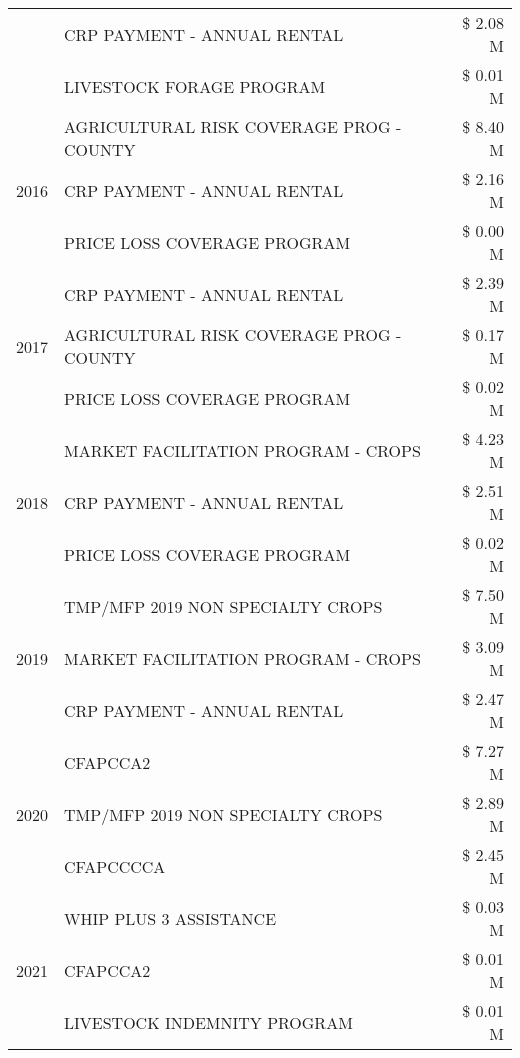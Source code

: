 \begin{tabular}{llr}
 & CRP PAYMENT - ANNUAL RENTAL & \$ 2.08 M \\
 & LIVESTOCK FORAGE PROGRAM & \$ 0.01 M \\
\cline{1-3}
\multirow[t]{3}{*}{2016} & AGRICULTURAL RISK COVERAGE PROG - COUNTY & \$ 8.40 M \\
 & CRP PAYMENT - ANNUAL RENTAL & \$ 2.16 M \\
 & PRICE LOSS COVERAGE PROGRAM & \$ 0.00 M \\
\cline{1-3}
\multirow[t]{3}{*}{2017} & CRP PAYMENT - ANNUAL RENTAL & \$ 2.39 M \\
 & AGRICULTURAL RISK COVERAGE PROG - COUNTY & \$ 0.17 M \\
 & PRICE LOSS COVERAGE PROGRAM & \$ 0.02 M \\
\cline{1-3}
\multirow[t]{3}{*}{2018} & MARKET FACILITATION PROGRAM - CROPS & \$ 4.23 M \\
 & CRP PAYMENT - ANNUAL RENTAL & \$ 2.51 M \\
 & PRICE LOSS COVERAGE PROGRAM & \$ 0.02 M \\
\cline{1-3}
\multirow[t]{3}{*}{2019} & TMP/MFP 2019 NON SPECIALTY CROPS & \$ 7.50 M \\
 & MARKET FACILITATION PROGRAM - CROPS & \$ 3.09 M \\
 & CRP PAYMENT - ANNUAL RENTAL & \$ 2.47 M \\
\cline{1-3}
\multirow[t]{3}{*}{2020} & CFAPCCA2 & \$ 7.27 M \\
 & TMP/MFP 2019 NON SPECIALTY CROPS & \$ 2.89 M \\
 & CFAPCCCCA & \$ 2.45 M \\
\cline{1-3}
\multirow[t]{3}{*}{2021} & WHIP PLUS 3 ASSISTANCE & \$ 0.03 M \\
 & CFAPCCA2 & \$ 0.01 M \\
 & LIVESTOCK INDEMNITY PROGRAM & \$ 0.01 M \\
\cline{1-3}
\bottomrule
\end{tabular}
